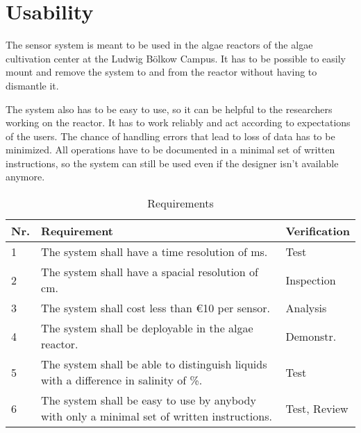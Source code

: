 \section{Usability}

The sensor system is meant to be used in the algae reactors of the algae cultivation center at the Ludwig Bölkow Campus. It has to be possible to easily mount and remove the system to and from the reactor without having to dismantle it.

The system also has to be easy to use, so it can be helpful to the researchers working on the reactor. It has to work reliably and act according to expectations of the users. The chance of handling errors that lead to loss of data has to be minimized. All operations have to be documented in a minimal set of written instructions, so the system can still be used even if the designer isn't available anymore.

\begin{table}[H]
    \centering

    \caption[Requirements]{Requirements}
    \label{tab:req}
    \begin{tabular}{lp{}l}
        	\toprule
        	Nr. & Requirement & Verification \tabularnewline
        	\midrule
		1 & The system shall have a time resolution of \unit[10]{ms}. & Test \tabularnewline
		2 & The system shall have a spacial resolution of \unit[1]{cm}. & Inspection \tabularnewline
		3 & The system shall cost less than \euro{10} per sensor.  & Analysis \tabularnewline
		4 & The system shall be deployable in the algae reactor. & Demonstr. \tabularnewline
		5 & The system shall be able to distinguish liquids with a difference in salinity of \unit[1]{\%}.  & Test \tabularnewline
		6 & The system shall be easy to use by anybody with only a minimal set of written instructions. & Test, Review \tabularnewline
        \bottomrule
    \end{tabular}
\end{table}
